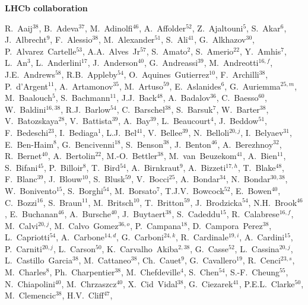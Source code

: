 \documentclass[12pt,a4paper]{article}
\begin{document}
\newpage
\centerline{\large\bf LHCb collaboration}
\begin{flushleft}
\small
R.~Aaij$^{38}$, 
B.~Adeva$^{37}$, 
M.~Adinolfi$^{46}$, 
A.~Affolder$^{52}$, 
Z.~Ajaltouni$^{5}$, 
S.~Akar$^{6}$, 
J.~Albrecht$^{9}$, 
F.~Alessio$^{38}$, 
M.~Alexander$^{51}$, 
S.~Ali$^{41}$, 
G.~Alkhazov$^{30}$, 
P.~Alvarez~Cartelle$^{53}$, 
A.A.~Alves~Jr$^{57}$, 
S.~Amato$^{2}$, 
S.~Amerio$^{22}$, 
Y.~Amhis$^{7}$, 
L.~An$^{3}$, 
L.~Anderlini$^{17}$, 
J.~Anderson$^{40}$, 
G.~Andreassi$^{39}$, 
M.~Andreotti$^{16,f}$, 
J.E.~Andrews$^{58}$, 
R.B.~Appleby$^{54}$, 
O.~Aquines~Gutierrez$^{10}$, 
F.~Archilli$^{38}$, 
P.~d'Argent$^{11}$, 
A.~Artamonov$^{35}$, 
M.~Artuso$^{59}$, 
E.~Aslanides$^{6}$, 
G.~Auriemma$^{25,m}$, 
M.~Baalouch$^{5}$, 
S.~Bachmann$^{11}$, 
J.J.~Back$^{48}$, 
A.~Badalov$^{36}$, 
C.~Baesso$^{60}$, 
W.~Baldini$^{16,38}$, 
R.J.~Barlow$^{54}$, 
C.~Barschel$^{38}$, 
S.~Barsuk$^{7}$, 
W.~Barter$^{38}$, 
V.~Batozskaya$^{28}$, 
V.~Battista$^{39}$, 
A.~Bay$^{39}$, 
L.~Beaucourt$^{4}$, 
J.~Beddow$^{51}$, 
F.~Bedeschi$^{23}$, 
I.~Bediaga$^{1}$, 
L.J.~Bel$^{41}$, 
V.~Bellee$^{39}$, 
N.~Belloli$^{20,j}$, 
I.~Belyaev$^{31}$, 
E.~Ben-Haim$^{8}$, 
G.~Bencivenni$^{18}$, 
S.~Benson$^{38}$, 
J.~Benton$^{46}$, 
A.~Berezhnoy$^{32}$, 
R.~Bernet$^{40}$, 
A.~Bertolin$^{22}$, 
M.-O.~Bettler$^{38}$, 
M.~van~Beuzekom$^{41}$, 
A.~Bien$^{11}$, 
S.~Bifani$^{45}$, 
P.~Billoir$^{8}$, 
T.~Bird$^{54}$, 
A.~Birnkraut$^{9}$, 
A.~Bizzeti$^{17,h}$, 
T.~Blake$^{48}$, 
F.~Blanc$^{39}$, 
J.~Blouw$^{10}$, 
S.~Blusk$^{59}$, 
V.~Bocci$^{25}$, 
A.~Bondar$^{34}$, 
N.~Bondar$^{30,38}$, 
W.~Bonivento$^{15}$, 
S.~Borghi$^{54}$, 
M.~Borsato$^{7}$, 
T.J.V.~Bowcock$^{52}$, 
E.~Bowen$^{40}$, 
C.~Bozzi$^{16}$, 
S.~Braun$^{11}$, 
M.~Britsch$^{10}$, 
T.~Britton$^{59}$, 
J.~Brodzicka$^{54}$, 
N.H.~Brook$^{46}$, 
E.~Buchanan$^{46}$, 
A.~Bursche$^{40}$, 
J.~Buytaert$^{38}$, 
S.~Cadeddu$^{15}$, 
R.~Calabrese$^{16,f}$, 
M.~Calvi$^{20,j}$, 
M.~Calvo~Gomez$^{36,o}$, 
P.~Campana$^{18}$, 
D.~Campora~Perez$^{38}$, 
L.~Capriotti$^{54}$, 
A.~Carbone$^{14,d}$, 
G.~Carboni$^{24,k}$, 
R.~Cardinale$^{19,i}$, 
A.~Cardini$^{15}$, 
P.~Carniti$^{20,j}$, 
L.~Carson$^{50}$, 
K.~Carvalho~Akiba$^{2,38}$, 
G.~Casse$^{52}$, 
L.~Cassina$^{20,j}$, 
L.~Castillo~Garcia$^{38}$, 
M.~Cattaneo$^{38}$, 
Ch.~Cauet$^{9}$, 
G.~Cavallero$^{19}$, 
R.~Cenci$^{23,s}$, 
M.~Charles$^{8}$, 
Ph.~Charpentier$^{38}$, 
M.~Chefdeville$^{4}$, 
S.~Chen$^{54}$, 
S.-F.~Cheung$^{55}$, 
N.~Chiapolini$^{40}$, 
M.~Chrzaszcz$^{40}$, 
X.~Cid~Vidal$^{38}$, 
G.~Ciezarek$^{41}$, 
P.E.L.~Clarke$^{50}$, 
M.~Clemencic$^{38}$, 
H.V.~Cliff$^{47}$, 

\end{flushleft}
\end{document}
